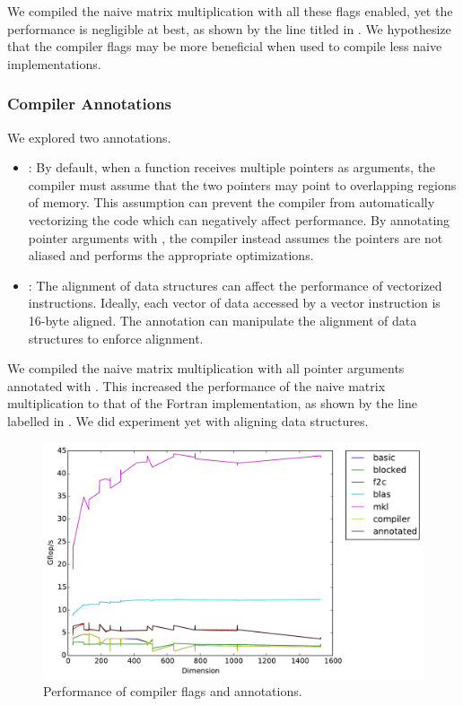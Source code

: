 We compiled the naive matrix multiplication with all these \icc{} flags
enabled, yet the performance is negligible at best, as shown by the line titled
 in . We hypothesize that the compiler flags may
be more beneficial when used to compile less naive implementations.

\subsubsection{Compiler Annotations}
We explored two \icc{} annotations.
\begin{itemize}
  \item {}:
    By default, when a function receives multiple pointers as arguments, the
    compiler must assume that the two pointers may point to overlapping regions
    of memory. This assumption can prevent the compiler from automatically
    vectorizing the code which can negatively affect performance. By annotating
    pointer arguments with , the compiler instead assumes the
    pointers are not aliased and performs the appropriate optimizations.

  \item {}:
    The alignment of data structures can affect the performance of vectorized
    instructions. Ideally, each vector of data accessed by a vector instruction
    is 16-byte aligned. The  annotation can manipulate the
    alignment of data structures to enforce alignment.
\end{itemize}

We compiled the naive matrix multiplication with all pointer arguments
annotated with . This increased the performance of the naive
matrix multiplication to that of the Fortran implementation, as shown by the
line labelled  in . We did experiment yet with
aligning data structures.

\begin{figure}[h]
  \centering
  \includegraphics[width=\textwidth]{timing_compiler.pdf}
  \caption{Performance of compiler flags and annotations.}
  \label{fig:compiler}
\end{figure}
